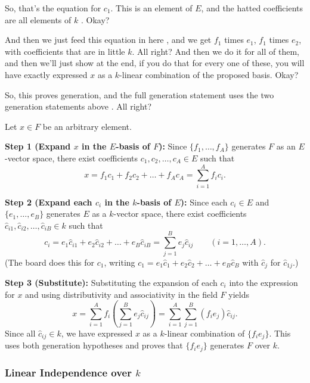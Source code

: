 \begin{proofWrapper}
\begin{speech}[00:32:10 - 00:33:54]
So, that's the equation for $c_1$. This is an element of $E$, and the hatted coefficients are all elements of $k$ . Okay?

And then we just feed this equation in here , and we get $f_1$ times $e_1$, $f_1$ times $e_2$, with coefficients that are in little $k$. All right? And then we do it for all of them, and then we'll just show at the end, if you do that for every one of these, you will have exactly expressed $x$ as a $k$-linear combination of the proposed basis. Okay?

So, this proves generation, and the full generation statement uses the two generation statements above . All right?
\end{speech}

\begin{content}
Let $x \in F$ be an arbitrary element.

\textbf{Step 1 (Expand $x$ in the $E$-basis of $F$):} Since $\{f_1, \dots, f_A\}$ generates $F$ as an $E$-vector space, there exist coefficients $c_1, c_2, \dots, c_A \in E$ such that
\[
x = f_1 c_1 + f_2 c_2 + \dots + f_A c_A = \sum_{i=1}^A f_i c_i.
\]

\textbf{Step 2 (Expand each $c_i$ in the $k$-basis of $E$):} Since each $c_i \in E$ and $\{e_1, \dots, e_B\}$ generates $E$ as a $k$-vector space, there exist coefficients $\hat{c}_{i1}, \hat{c}_{i2}, \dots, \hat{c}_{iB} \in k$ such that
\[
c_i = e_1 \hat{c}_{i1} + e_2 \hat{c}_{i2} + \dots + e_B \hat{c}_{iB} = \sum_{j=1}^B e_j \hat{c}_{ij} \qquad (i = 1, \dots, A).
\]
(The board does this for $c_1$, writing $c_1 = e_1 \hat{c}_1 + e_2 \hat{c}_2 + \dots + e_B \hat{c}_B$ with $\hat{c}_j$ for $\hat{c}_{1j}$.)

\textbf{Step 3 (Substitute):} Substituting the expansion of each $c_i$ into the expression for $x$ and using distributivity and associativity in the field $F$ yields
\[
x = \sum_{i=1}^A f_i \left( \sum_{j=1}^B e_j \hat{c}_{ij} \right) = \sum_{i=1}^A \sum_{j=1}^B (f_i e_j) \hat{c}_{ij}.
\]
Since all $\hat{c}_{ij} \in k$, we have expressed $x$ as a $k$-linear combination of $\{f_i e_j\}$. This uses both generation hypotheses and proves that $\{f_i e_j\}$ generates $F$ over $k$.
\end{content}

\subsubsection{Linear Independence over \texorpdfstring{$k$}{k}}


\end{proofWrapper}
